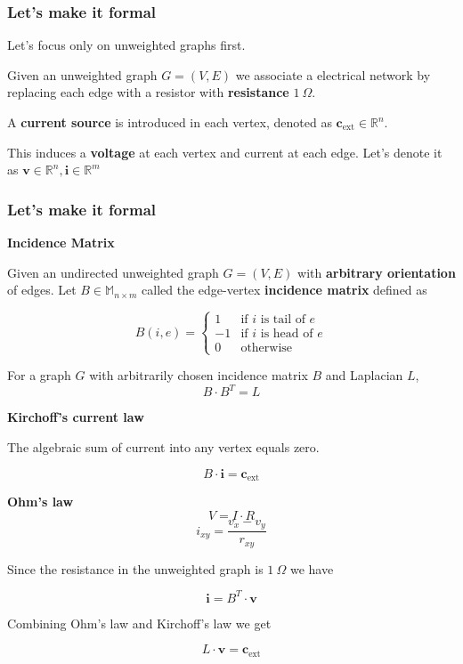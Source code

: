 \documentclass{beamer}
\newcommand{\Mset}[2]{\ensuremath{\mathbb{M}_{#1 \times #2}}}
\begin{document}
\begin{frame}

\frametitle{Let's make it formal}
Let's focus only on unweighted graphs first. 

\leavevmode\hphantom{ }
\leavevmode\hphantom{ }

\pause
Given an unweighted graph $G = (V,E)$ we associate a electrical network by replacing each edge with a resistor with \textbf{resistance} $1 \ \Omega$. 

\leavevmode\hphantom{ }
\leavevmode\hphantom{ }

\pause
A \textbf{current source} is introduced in each vertex, denoted as $\textbf{c}_{\text{ext}} \in \mathbb{R}^n$. 

\leavevmode\hphantom{ }
\leavevmode\hphantom{ }

\pause
This induces a \textbf{voltage} at each vertex and current at each edge. Let's denote it as $\textbf{v} \in \mathbb{R}^n, \textbf{i} \in \mathbb{R}^m$





\end{frame}


\begin{frame}
 \frametitle{Let's make it formal}


 \textbf{Incidence Matrix}
 
Given an undirected unweighted graph $G=(V,E)$ with \textbf{arbitrary orientation} of edges. Let $B \in  \Mset{n}{m}$ called the edge-vertex \textbf{incidence matrix} defined as 

\[
    B(i, e) = 
\begin{cases}
 1 & \text{if } i \text{ is tail of } e\\
 -1 & \text{if } i \text{ is head of } e \\
 0 & \text{otherwise}
\end{cases}
\]

\pause
\begin{lemma}
  For a graph $G$ with arbitrarily chosen incidence matrix $B$ and Laplacian $L$, 
 $$B \cdot B^T = L$$
\end{lemma}


\end{frame}

\begin{frame}
 
\textbf{Kirchoff's current law}

The algebraic sum of current into any vertex equals zero. 

$$ B \cdot \textbf{i} = \textbf{c}_{\text{ext}} $$

\textbf{Ohm's law}
$$ V = I \cdot R$$
$$ i_{xy} = \frac{v_x - v_y}{r_{xy}} $$

Since the resistance in the unweighted graph is $1 \ \Omega$ we have 

$$ \textbf{i} = B^T \cdot \textbf{v} $$ 


Combining Ohm's law and Kirchoff's law we get 

$$ L \cdot \textbf{v} = \textbf{c}_{\text{ext}} $$ 

\end{frame}
\end{document}
